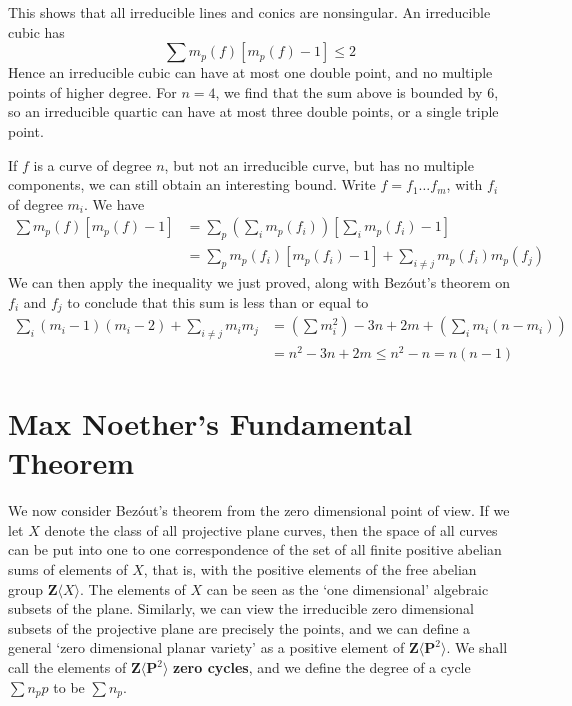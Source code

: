 This shows that all irreducible lines and conics are nonsingular. An irreducible cubic has
%
\[ \sum m_p(f)[m_p(f) - 1] \leq 2 \]
%
Hence an irreducible cubic can have at most one double point, and no multiple points of higher degree. For $n = 4$, we find that the sum above is bounded by $6$, so an irreducible quartic can have at most three double points, or a single triple point.

If $f$ is a curve of degree $n$, but not an irreducible curve, but has no multiple components, we can still obtain an interesting bound. Write $f = f_1 \dots f_m$, with $f_i$ of degree $m_i$. We have
%
\begin{align*}
    \sum m_p(f)[m_p(f) - 1] &= \sum_p \left( \sum_i m_p(f_i) \right) \left[\sum_i m_p(f_i) - 1 \right]\\
    &= \sum_p m_p(f_i)[m_p(f_i) - 1] + \sum_{i \neq j} m_p(f_i)m_p(f_j)
\end{align*}
%
We can then apply the inequality we just proved, along with Bez\'{o}ut's theorem on $f_i$ and $f_j$ to conclude that this sum is less than or equal to
%
\begin{align*}
    \sum_i (m_i - 1)(m_i - 2) + \sum_{i \neq j} m_im_j &= \left( \sum m_i^2 \right) - 3n + 2m + \left( \sum_i m_i(n-m_i) \right)\\
    &= n^2 - 3n + 2m \leq n^2 - n = n(n-1)
\end{align*}

\section{Max Noether's Fundamental Theorem}

We now consider Bez\'{o}ut's theorem from the zero dimensional point of view. If we let $X$ denote the class of all projective plane curves, then the space of all curves can be put into one to one correspondence of the set of all finite positive abelian sums of elements of $X$, that is, with the positive elements of the free abelian group $\mathbf{Z}\langle X \rangle$. The elements of $X$ can be seen as the `one dimensional' algebraic subsets of the plane. Similarly, we can view the irreducible zero dimensional subsets of the projective plane are precisely the points, and we can define a general `zero dimensional planar variety' as a positive element of $\mathbf{Z} \langle \mathbf{P}^2 \rangle$. We shall call the elements of $\mathbf{Z} \langle \mathbf{P}^2 \rangle$ {\bf zero cycles}, and we define the degree of a cycle $\sum n_p p$ to be $\sum n_p$.

